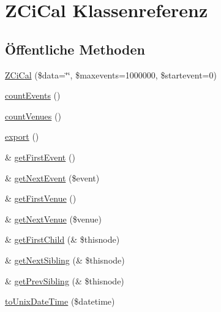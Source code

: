 \hypertarget{class_z_ci_cal}{}\section{Z\+Ci\+Cal Klassenreferenz}
\label{class_z_ci_cal}
\subsection*{Öffentliche Methoden}
\begin{DoxyCompactItemize}
\item 
\mbox{\hyperlink{class_z_ci_cal_a6ab69b77d026ec34e365254a2983dd2b}{Z\+Ci\+Cal}} (\$data=\char`\"{}\char`\"{}, \$maxevents=1000000, \$startevent=0)
\item 
\mbox{\hyperlink{class_z_ci_cal_a73b0dcc6ab0ad3cde8278043f086dce2}{count\+Events}} ()
\item 
\mbox{\hyperlink{class_z_ci_cal_a42cb8c07e556085f8851534b51131c31}{count\+Venues}} ()
\item 
\mbox{\hyperlink{class_z_ci_cal_acfb2970b97e2dd3cdba13ba5dc9a1514}{export}} ()
\item 
\& \mbox{\hyperlink{class_z_ci_cal_ae688f91daf6de26451b26b2fc6da0454}{get\+First\+Event}} ()
\item 
\& \mbox{\hyperlink{class_z_ci_cal_aa7e551ed399211dec2f63f4610e0ac1c}{get\+Next\+Event}} (\$event)
\item 
\& \mbox{\hyperlink{class_z_ci_cal_addfaf8b37c42f06213b22cdb2faceb67}{get\+First\+Venue}} ()
\item 
\& \mbox{\hyperlink{class_z_ci_cal_a39f53526421aa7122720bd5fae17b886}{get\+Next\+Venue}} (\$venue)
\item 
\& \mbox{\hyperlink{class_z_ci_cal_afda835926af9504bffa24baa201793cf}{get\+First\+Child}} (\& \$thisnode)
\item 
\& \mbox{\hyperlink{class_z_ci_cal_a58f91909ccb0ce0cd0252427945b0049}{get\+Next\+Sibling}} (\& \$thisnode)
\item 
\& \mbox{\hyperlink{class_z_ci_cal_a14d0d0b4ce2320b9fff1ecc5a6311867}{get\+Prev\+Sibling}} (\& \$thisnode)
\item 
\mbox{\hyperlink{class_z_ci_cal_ae50256ea2ae21dbfca3f22e92f78d753}{to\+Unix\+Date\+Time}} (\$datetime)
\end{DoxyCompactItemize}
